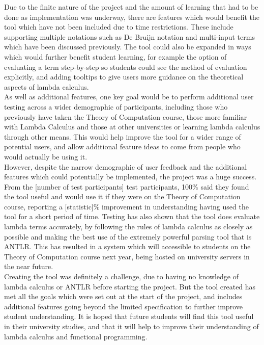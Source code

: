 \documentclass[a4paper,11pt]{report}
\begin{document}
Due to the finite nature of the project and the amount of learning that had to be done as implementation was underway, there are features which would benefit the tool which have not been included due to time restrictions. These include supporting multiple notations such as De Bruijn notation and multi-input terms which have been discussed previously. The tool could also be expanded in ways which would further benefit student learning, for example the option of evaluating a term step-by-step so students could see the method of evaluation explicitly, and adding tooltips to give users more guidance on the theoretical aspects of lambda calculus.\\

As well as additional features, one key goal would be to perform additional user testing across a wider demographic of participants, including those who previously have taken the Theory of Computation course, those more familiar with Lambda Calculus and those at other universities or learning lambda calculus through other means. This would help improve the tool for a wider range of potential users, and allow additional feature ideas to come from people who would actually be using it.\\

However, despite the narrow demographic of user feedback and the additional features which could potentially be implemented, the project was a huge success. From the [number of test participants] test participants, 100\% said they found the tool useful and would use it if they were on the Theory of Computation course, reporting a [statistic]\% improvement in understanding having used the tool for a short period of time. Testing has also shown that the tool does evaluate lambda terms accurately, by following the rules of lambda calculus as closely as possible and making the best use of the extremely powerful parsing tool that is ANTLR. This has resulted in a system which will accessible to students on the Theory of Computation course next year, being hosted on university servers in the near future.\\

Creating the tool was definitely a challenge, due to having no knowledge of lambda calculus or ANTLR before starting the project. But the tool created has met all the goals which were set out at the start of the project, and includes additional features going beyond the limited specification to further improve student understanding. It is hoped that future students will find this tool useful in their university studies, and that it will help to improve their understanding of lambda calculus and functional programming.

\newpage
\printbibliography
\newpage
\end{document}
